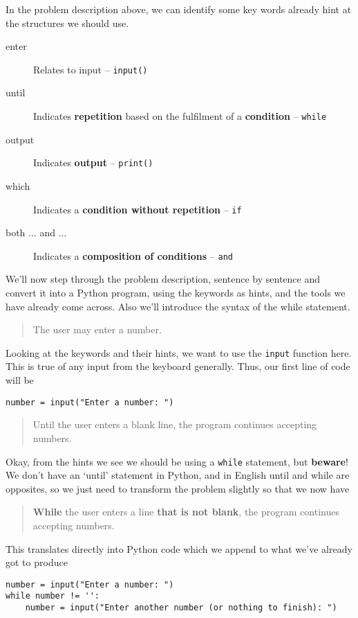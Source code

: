 In the problem description above, we can identify some key words   already hint at the structures we should use.
\begin{description}
	\item[enter] Relates to input -- \texttt{input()}
	\item[until] Indicates \textbf{repetition} based on the fulfilment    of a \textbf{condition} -- \texttt{while} 
	\item[output] Indicates \textbf{output} -- \texttt{print()}
	\item[which] Indicates a \textbf{condition without repetition} -- \texttt{if}    
	\item[both ... and ...] Indicates a \textbf{composition of conditions} -- \texttt{and}    
\end{description}

We'll now step through the problem description, sentence by sentence   and convert it into a Python program, using the keywords as hints, and   the tools we have already come across. Also we'll introduce the syntax   of the while statement.
\begin{quotation}    The user may enter a number.   
\end{quotation}

Looking at the keywords and their hints, we want to use the   \texttt{input} function here. This is true of any input from the keyboard generally.   Thus, our first line of code will be
\begin{lstlisting}
number = input("Enter a number: ")
\end{lstlisting}
\begin{quotation}    Until the user enters a blank line, the program continues accepting numbers.   
\end{quotation}

Okay, from the hints we see we should be using a \texttt{while} statement,   but \textbf{beware}! We don't have an `until' statement in   Python, and in English until and while are opposites, so we just need   to transform the problem slightly so that we now have
\begin{quotation}\textbf{While} the user enters a line \textbf{that is not    blank}, the program continues accepting numbers.    
\end{quotation}

This translates directly into Python code which we append to what   we've already got to produce
\begin{lstlisting}
number = input("Enter a number: ")
while number != '':
    number = input("Enter another number (or nothing to finish): ")
\end{lstlisting}

